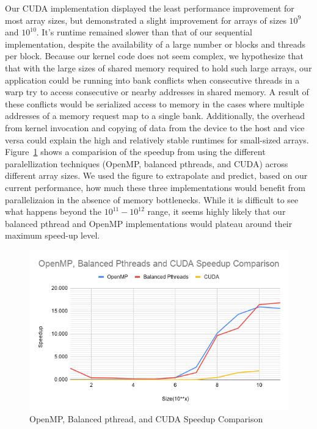 \documentclass[11pt,twocolumn]{article}
\begin{document}
Our CUDA implementation displayed the least performance improvement for
most array sizes, but demonstrated a slight improvement for arrays of
sizes $10^9$ and $10^{10}$. It's runtime remained slower than that of 
our sequential implementation, despite the availability of a large
number or blocks and threads per block. Because our kernel code does 
not seem complex, we hypothesize that that with the large sizes of
shared memory required to hold such large arrays, our application 
could be running into bank conflicts when consecutive threads in a
warp try to access consecutive or nearby addresses in shared memory.
A result of these conflicts would be serialized access to memory in
the cases where multiple addresses of a memory request map to a single 
bank. Additionally, the overhead from kernel invocation and copying
of data from the device to the host and vice versa could explain the 
high and relatively stable runtimes for small-sized arrays.  
Figure~\ref{speedupcomp} shows a comparision of the speedup from using
the different paralellization techniques (OpenMP, balanced pthreads,
and CUDA) across different array sizes. We used the figure to 
extrapolate and predict, based on our current performance, how much
these three implementations would benefit from parallelizaion in the
absence of memory bottlenecks. While it is difficult to see what 
happens beyond the $10^{11}-10^{12}$ range, it seems highly likely 
that our balanced pthread and OpenMP implementations would plateau 
around their maximum speed-up level.

\begin{figure}
\centering
\includegraphics[width=15cm]{speedup-comp.png}
\caption{OpenMP, Balanced pthread, and CUDA Speedup Comparison}
\label{speedupcomp}
\end{figure}
\end{document}
